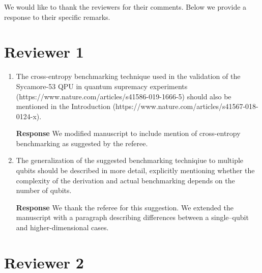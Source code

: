 \documentclass[a4paper,12pt]{article}
\newcommand{\1}{{\rm 1\hspace{-0.9mm}l}}
\newenvironment{response}{\vspace{1em}\noindent\textbf{Response}}{\vspace{1em}}
\begin{document}
We would like to thank the reviewers for their comments. Below we provide
a response to their specific remarks.

\section{Reviewer 1}

\begin{enumerate}
  \item The cross-entropy benchmarking technique used in the validation of the Sycamore-53 QPU in
    quantum supremacy experiments (https://www.nature.com/articles/s41586-019-1666-5) should also
    be mentioned in the Introduction (https://www.nature.com/articles/s41567-018-0124-x).

    \begin{response} We modified manuscript to include mention of cross-entropy benchmarking as
      suggested by the referee.
    \end{response}
  \item The generalization of the suggested benchmarking techniqiue to multiple qubits should be
    described in more detail, explicitly mentioning whether the complexity of the derivation and
    actual benchmarking depends on the number of qubits.

    \begin{response} We thank the referee for this suggestion. We extended the manuscript with a
      paragraph describing differences between a single--qubit and higher-dimensional cases.
    \end{response}

\end{enumerate}
\section{Reviewer 2}
\end{document}
